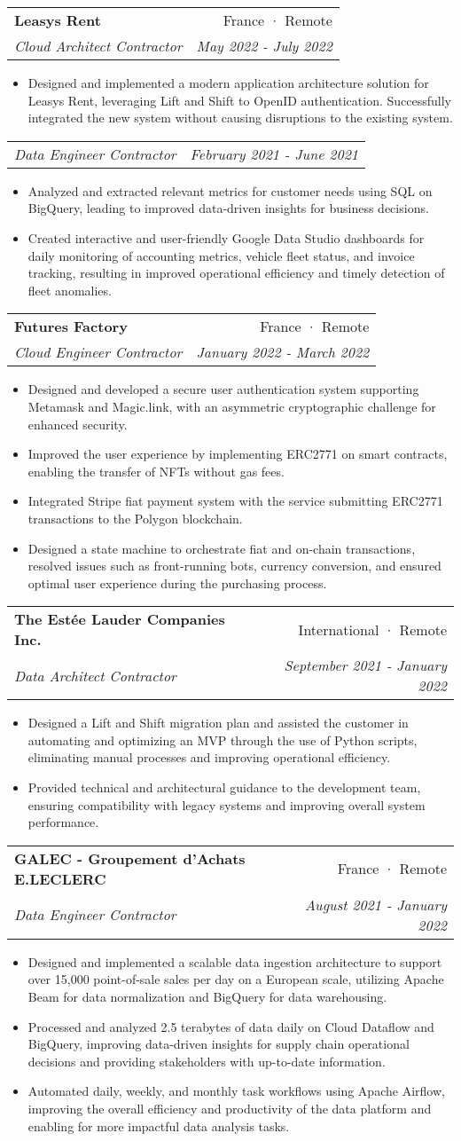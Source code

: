 \documentclass[letterpaper,11pt]{article}
\makeatletter
\newcommand{\resumeItem}[1]{
  \item\small{#1 \vspace{-2pt}}
}
\newcommand{\resumeSubheading}[4]{
  \vspace{-1pt}\item
    \begin{tabular*}{0.97\textwidth}[t]{l@{\extracolsep{\fill}}r}
      \textbf{#1} & #2 \\
      \textit{\small#3} & \textit{\small #4} \\
    \end{tabular*}\vspace{-5pt}
}
\newcommand{\resumeSubSubheading}[2]{
  \begin{tabular*}{0.97\textwidth}{l@{\extracolsep{\fill}}r}
    \textit{\small#1} & \textit{\small #2} \\
  \end{tabular*}\vspace{-5pt}
}
\newcommand{\resumeItemListStart}{\begin{itemize}}
\newcommand{\resumeItemListEnd}{\end{itemize}\vspace{-5pt}}
\makeatother
\begin{document}
\resumeSubheading{Leasys Rent}
{France · Remote}
{Cloud Architect Contractor}
{May 2022 - July 2022}
\resumeItemListStart{}
\resumeItem{
	Designed and implemented a modern application architecture solution for Leasys Rent,
	leveraging Lift and Shift to OpenID authentication. Successfully integrated the
	new system without causing disruptions to the existing system.
}
\resumeItemListEnd{}


\resumeSubSubheading{Data Engineer Contractor}
{February 2021 - June 2021}
\resumeItemListStart{}
\resumeItem{
	Analyzed and extracted relevant metrics for customer needs using SQL on
	BigQuery, leading to improved data-driven insights for business decisions.
}
\resumeItem{
	Created interactive and user-friendly Google Data Studio dashboards for daily
	monitoring of accounting metrics, vehicle fleet status, and invoice tracking,
	resulting in improved operational efficiency and timely detection of fleet
	anomalies.
}
\resumeItemListEnd{}


\resumeSubheading{Futures Factory}
{France · Remote}
{Cloud Engineer Contractor}
{January 2022 - March 2022}
\resumeItemListStart{}
\resumeItem{
	Designed and developed a secure user authentication system supporting Metamask
	and Magic.link, with an asymmetric cryptographic challenge for enhanced
	security.
}
\resumeItem{
	Improved the user experience by implementing ERC2771 on smart contracts,
	enabling the transfer of NFTs without gas fees.
}
\resumeItem{
	Integrated Stripe fiat payment system with the service submitting ERC2771
	transactions to the Polygon blockchain.
}
\resumeItem{
	Designed a state machine to orchestrate fiat and on-chain transactions, resolved
	issues such as front-running bots, currency conversion, and ensured optimal user
	experience during the purchasing process.
}
\resumeItemListEnd{}


\resumeSubheading{The Estée Lauder Companies Inc.}
{International · Remote}
{Data Architect Contractor}
{September 2021 - January 2022}
\resumeItemListStart{}
\resumeItem{
	Designed a Lift and Shift migration plan and assisted the customer in automating
	and optimizing an MVP through the use of Python scripts, eliminating manual
	processes and improving operational efficiency.
}
\resumeItem{
	Provided technical and architectural guidance to the development team, ensuring
	compatibility with legacy systems and improving overall system performance.
}
\resumeItemListEnd{}


\resumeSubheading{GALEC - Groupement d'Achats E.LECLERC}
{France · Remote}
{Data Engineer Contractor}
{August 2021 - January 2022}
\resumeItemListStart{}
\resumeItem{
	Designed and implemented a scalable data ingestion architecture to support over
	15,000 point-of-sale sales per day on a European scale, utilizing Apache Beam
	for data normalization and BigQuery for data warehousing.
}
\resumeItem{
	Processed and analyzed 2.5 terabytes of data daily on Cloud Dataflow and
	BigQuery, improving data-driven insights for supply chain operational decisions
	and providing stakeholders with up-to-date information.
}
\resumeItem{
	Automated daily, weekly, and monthly task workflows using Apache Airflow,
	improving the overall efficiency and productivity of the data platform and
	enabling for more impactful data analysis tasks.
}
\resumeItemListEnd{}
\end{document}
